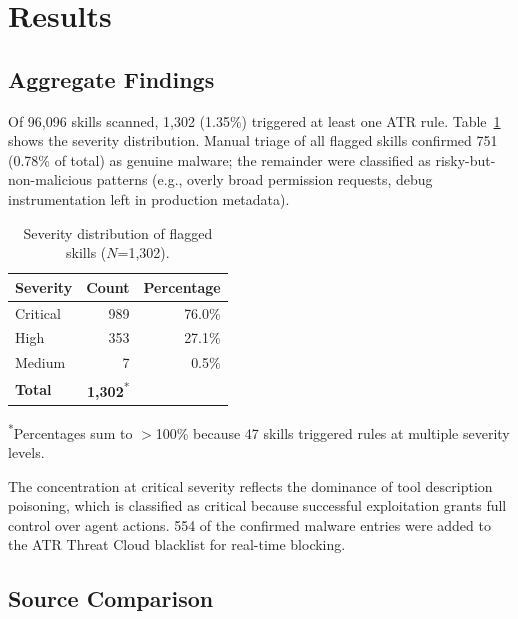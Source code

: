 \documentclass[letterpaper,twocolumn,10pt]{article}
\begin{document}
\section{Results}
\label{sec:results}

\subsection{Aggregate Findings}

Of 96,096 skills scanned, 1,302 (1.35\%) triggered at least one ATR rule.
Table~\ref{tab:severity} shows the severity distribution.  Manual triage
of all flagged skills confirmed 751 (0.78\% of total) as genuine
malware; the remainder were classified as risky-but-non-malicious
patterns (e.g., overly broad permission requests, debug instrumentation
left in production metadata).

\begin{table}[t]
\centering
\caption{Severity distribution of flagged skills ($N$=1,302).}
\label{tab:severity}
\small
\begin{tabular}{@{}lrr@{}}
\toprule
\textbf{Severity} & \textbf{Count} & \textbf{Percentage} \\
\midrule
Critical & 989 & 76.0\% \\
High     & 353 & 27.1\% \\
Medium   &   7 &  0.5\% \\
\midrule
\textbf{Total} & \textbf{1,302}\textsuperscript{*} & \\
\bottomrule
\end{tabular}
\begin{flushleft}
\textsuperscript{*}Percentages sum to $>$100\% because 47 skills triggered rules at multiple severity levels.
\end{flushleft}
\end{table}

The concentration at critical severity reflects the dominance of tool
description poisoning, which is classified as critical because successful
exploitation grants full control over agent actions.  554 of the
confirmed malware entries were added to the ATR Threat Cloud blacklist
for real-time blocking.

\subsection{Source Comparison}
\end{document}
